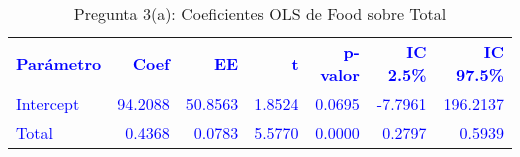 \begin{table}[H]
\centering
\caption{Pregunta 3(a): Coeficientes OLS de Food sobre Total}
\label{tab:q3a_coefs}
\begin{tabular}{lrrrrrr}
\rowcolor{blue!10}
\toprule
\rowcolor{blue!20}
\textcolor{blue}{\textbf{Parámetro}} & \textcolor{blue}{\textbf{Coef}} & \textcolor{blue}{\textbf{EE}} & \textcolor{blue}{\textbf{t}} & \textcolor{blue}{\textbf{p-valor}} & \textcolor{blue}{\textbf{IC 2.5\%}} & \textcolor{blue}{\textbf{IC 97.5\%}} \\
\addlinespace
\rowcolor{blue!10}
\textcolor{blue}{Intercept} & \textcolor{blue}{94.2088} & \textcolor{blue}{50.8563} & \textcolor{blue}{1.8524} & \textcolor{blue}{0.0695} & \textcolor{blue}{-7.7961} & \textcolor{blue}{196.2137} \\
\rowcolor{blue!10}
\textcolor{blue}{Total} & \textcolor{blue}{0.4368} & \textcolor{blue}{0.0783} & \textcolor{blue}{5.5770} & \textcolor{blue}{0.0000} & \textcolor{blue}{0.2797} & \textcolor{blue}{0.5939} \\
\bottomrule
\end{tabular}
\end{table}
